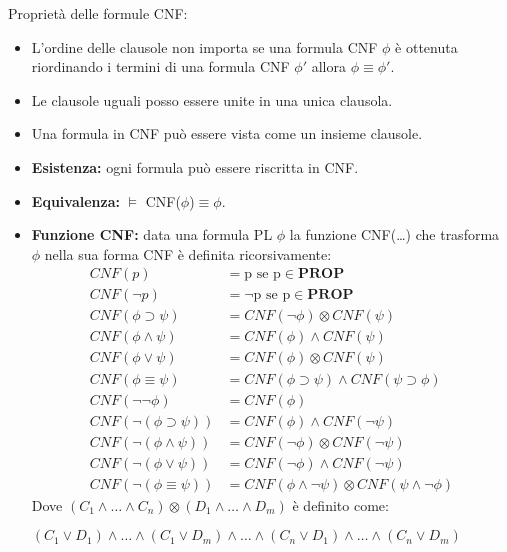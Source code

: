 \documentclass[../main.tex]{subfiles}
\begin{document}
    Proprietà delle formule CNF:
    \begin{itemize}
        \item L'ordine delle clausole non importa se una formula CNF $\phi$ è ottenuta riordinando i termini di una formula CNF $\phi \prime$ allora $\phi \equiv \phi \prime$.
        \item Le clausole uguali posso essere unite in una unica clausola.
        \item Una formula in CNF può essere vista come un insieme clausole.
        \item \textbf{Esistenza:} ogni formula può essere riscritta in CNF.
        \item \textbf{Equivalenza:} $\models$ CNF($\phi$)$\equiv \phi$.
        \item \textbf{Funzione CNF:} data una formula PL $\phi$ la funzione CNF(\dots) che trasforma $\phi$ nella sua forma CNF è definita ricorsivamente:
            \begin{align*}
                CNF(p)&=\text{p se p} \in \textbf{PROP}\\
                CNF(\lnot p) &=\text{$\lnot$p se p} \in \textbf{PROP}\\
                CNF(\phi \supset \psi) &= CNF(\lnot \phi) \otimes CNF(\psi)\\
                CNF(\phi \land \psi) &= CNF(\phi) \land CNF(\psi)\\
                CNF(\phi \lor \psi) &= CNF(\phi) \otimes CNF(\psi)\\
                CNF(\phi \equiv \psi) &= CNF(\phi \supset \psi) \land CNF(\psi \supset \phi)\\
                CNF(\lnot \lnot \phi) &= CNF(\phi)\\
                CNF(\lnot (\phi \supset \psi)) &= CNF(\phi) \land CNF(\lnot \psi)\\
                CNF(\lnot (\phi \land \psi)) &= CNF(\lnot \phi) \otimes CNF(\lnot \psi)\\
                CNF(\lnot (\phi \lor \psi)) &= CNF(\lnot \phi) \land CNF(\lnot \psi)\\
                CNF(\lnot (\phi \equiv \psi)) &= CNF(\phi \land \lnot \psi) \otimes CNF(\psi \land \lnot \phi)
            \end{align*}
            Dove $(C_1 \land \dots \land C_n) \otimes (D_1 \land \dots \land D_m)$ è definito come:
            \begin{center}
                $(C_1 \lor D_1) \land \dots \land(C_1 \lor D_m) \land \dots \land(C_n \lor D_1) \land \dots \land(C_n \lor D_m)$
            \end{center}
    \end{itemize}
\end{document}

